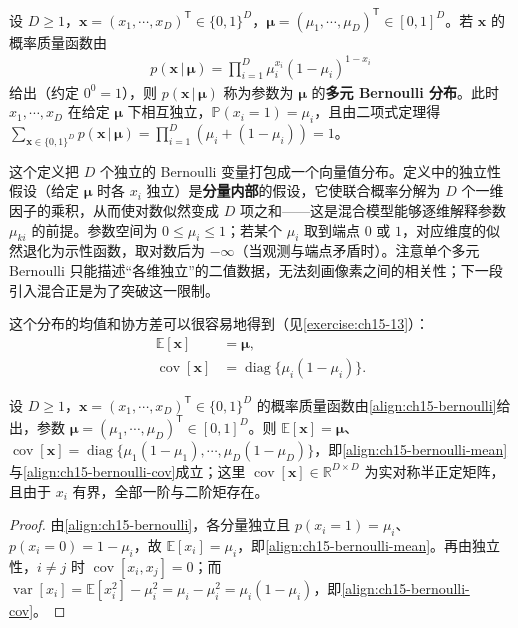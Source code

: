\documentclass[../../main.tex]{subfiles}
\begin{document}
\begin{definition}[多元 Bernoulli 分布]\label{definition:ch15-多元Bernoulli}
设 $D\geqslant1$，$\bm{x}=(x_1,\cdots,x_D)^{\mathsf T}\in\{0,1\}^{D}$，$\bm{\mu}=(\mu_1,\cdots,\mu_D)^{\mathsf T}\in[0,1]^{D}$。若 $\bm{x}$ 的概率质量函数由
\begin{align}
p(\bm{x}\,|\,\bm{\mu})=\prod_{i=1}^{D}\mu_i^{x_i}(1-\mu_i)^{1-x_i}
\label{align:ch15-bernoulli}
\end{align}
给出（约定 $0^{0}=1$），则 $p(\bm{x}\,|\,\bm{\mu})$ 称为参数为 $\bm{\mu}$ 的\textbf{多元 Bernoulli 分布}。此时 $x_1,\cdots,x_D$ 在给定 $\bm{\mu}$ 下相互独立，$\mathbb{P}(x_i=1)=\mu_i$，且由二项式定理得 $\sum_{\bm{x}\in\{0,1\}^{D}}p(\bm{x}\,|\,\bm{\mu})=\prod_{i=1}^{D}(\mu_i+(1-\mu_i))=1$。
\end{definition}

\begin{remark}
这个定义把 $D$ 个独立的 Bernoulli 变量打包成一个向量值分布。定义中的独立性假设（给定 $\bm{\mu}$ 时各 $x_i$ 独立）是\textbf{分量内部}的假设，它使联合概率分解为 $D$ 个一维因子的乘积，从而使对数似然变成 $D$ 项之和——这是混合模型能够逐维解释参数 $\mu_{ki}$ 的前提。参数空间为 $0\leqslant\mu_i\leqslant1$；若某个 $\mu_i$ 取到端点 $0$ 或 $1$，对应维度的似然退化为示性函数，取对数后为 $-\infty$（当观测与端点矛盾时）。注意单个多元 Bernoulli 只能描述“各维独立”的二值数据，无法刻画像素之间的相关性；下一段引入混合正是为了突破这一限制。
\end{remark}

这个分布的均值和协方差可以很容易地得到（见\cref{exercise:ch15-13}）：
\begin{align}
\mathbb{E}[\bm{x}]&=\bm{\mu},
\label{align:ch15-bernoulli-mean}\\
\operatorname{cov}[\bm{x}]&=\operatorname{diag}\{\mu_i(1-\mu_i)\}.
\label{align:ch15-bernoulli-cov}
\end{align}

\begin{proposition}\label{proposition:ch15-Bernoulli矩}
设 $D\geqslant1$，$\bm{x}=(x_1,\cdots,x_D)^{\mathsf T}\in\{0,1\}^{D}$ 的概率质量函数由\eqref{align:ch15-bernoulli}给出，参数 $\bm{\mu}=(\mu_1,\cdots,\mu_D)^{\mathsf T}\in[0,1]^{D}$。则 $\mathbb{E}[\bm{x}]=\bm{\mu}$、$\operatorname{cov}[\bm{x}]=\operatorname{diag}\{\mu_1(1-\mu_1),\cdots,\mu_D(1-\mu_D)\}$，即\eqref{align:ch15-bernoulli-mean}与\eqref{align:ch15-bernoulli-cov}成立；这里 $\operatorname{cov}[\bm{x}]\in\mathbb{R}^{D\times D}$ 为实对称半正定矩阵，且由于 $x_i$ 有界，全部一阶与二阶矩存在。
\end{proposition}
\begin{proof}
由\eqref{align:ch15-bernoulli}，各分量独立且 $p(x_i=1)=\mu_i$、$p(x_i=0)=1-\mu_i$，故 $\mathbb{E}[x_i]=\mu_i$，即\eqref{align:ch15-bernoulli-mean}。再由独立性，$i\neq j$ 时 $\operatorname{cov}[x_i,x_j]=0$；而 $\operatorname{var}[x_i]=\mathbb{E}[x_i^{2}]-\mu_i^{2}=\mu_i-\mu_i^{2}=\mu_i(1-\mu_i)$，即\eqref{align:ch15-bernoulli-cov}。
\end{proof}
\end{document}
